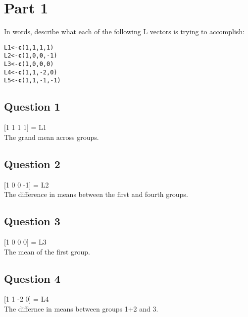 \documentclass{article}\usepackage[]{graphicx}\usepackage[]{color}
\makeatletter
\newcommand{\hlnum}[1]{\textcolor[rgb]{0.686,0.059,0.569}{#1}}%
\newcommand{\hlopt}[1]{\textcolor[rgb]{0,0,0}{#1}}%
\newcommand{\hlstd}[1]{\textcolor[rgb]{0.345,0.345,0.345}{#1}}%
\newcommand{\hlkwb}[1]{\textcolor[rgb]{0.69,0.353,0.396}{#1}}%
\newcommand{\hlkwd}[1]{\textcolor[rgb]{0.737,0.353,0.396}{\textbf{#1}}}%
\newenvironment{kframe}{%
 \def\at@end@of@kframe{}%
 \ifinner\ifhmode%
  \def\at@end@of@kframe{\end{minipage}}%
  \begin{minipage}{\columnwidth}%
 \fi\fi%
 \def\FrameCommand##1{\hskip\@totalleftmargin \hskip-\fboxsep
 \colorbox{shadecolor}{##1}\hskip-\fboxsep
     \hskip-\linewidth \hskip-\@totalleftmargin \hskip\columnwidth}%
 \MakeFramed {\advance\hsize-\width
   \@totalleftmargin\z@ \linewidth\hsize
   \@setminipage}}%
 {\par\unskip\endMakeFramed%
 \at@end@of@kframe}
\newenvironment{knitrout}{}{} %
\makeatother
\begin{document}
\section{Part 1}
In words, describe what each of the following L vectors is trying to accomplish: 
\begin{knitrout}
\color{fgcolor}\begin{kframe}
\begin{alltt}
\hlstd{L1} \hlkwb{<-} \hlkwd{c}\hlstd{(}\hlnum{1}\hlstd{,} \hlnum{1}\hlstd{,} \hlnum{1}\hlstd{,} \hlnum{1}\hlstd{)}
\hlstd{L2} \hlkwb{<-} \hlkwd{c}\hlstd{(}\hlnum{1}\hlstd{,} \hlnum{0}\hlstd{,} \hlnum{0}\hlstd{,}\hlopt{-}\hlnum{1}\hlstd{)}
\hlstd{L3} \hlkwb{<-} \hlkwd{c}\hlstd{(}\hlnum{1}\hlstd{,} \hlnum{0}\hlstd{,} \hlnum{0}\hlstd{,} \hlnum{0}\hlstd{)}
\hlstd{L4} \hlkwb{<-} \hlkwd{c}\hlstd{(}\hlnum{1}\hlstd{,} \hlnum{1}\hlstd{,}\hlopt{-}\hlnum{2}\hlstd{,} \hlnum{0}\hlstd{)}
\hlstd{L5} \hlkwb{<-} \hlkwd{c}\hlstd{(}\hlnum{1}\hlstd{,} \hlnum{1}\hlstd{,}\hlopt{-}\hlnum{1}\hlstd{,}\hlopt{-}\hlnum{1}\hlstd{)}
\end{alltt}
\end{kframe}
\end{knitrout}


\subsection{Question 1}
[1 1 1 1] = L1\\
The grand mean across groups.  

\subsection{Question 2}
[1 0 0 -1] = L2 \\
The difference in means between the first and fourth groups.

\subsection{Question 3}
[1 0 0 0] = L3 \\
The mean of the first group.  

\subsection{Question 4}
[1 1 -2 0] = L4 \\
The differnce in means between groups 1+2 and 3. 
\end{document}
